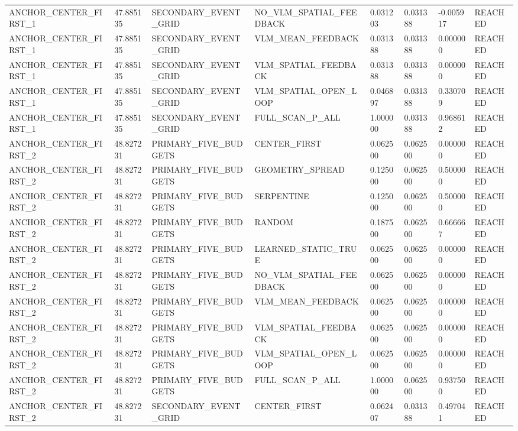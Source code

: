 \begin{tabular}{llllllll}
ANCHOR\_CENTER\_FIRST\_1 & 47.885135 & SECONDARY\_EVENT\_GRID & NO\_VLM\_SPATIAL\_FEEDBACK & 0.031203 & 0.031388 & -0.005917 & REACHED \\
ANCHOR\_CENTER\_FIRST\_1 & 47.885135 & SECONDARY\_EVENT\_GRID & VLM\_MEAN\_FEEDBACK & 0.031388 & 0.031388 & 0.000000 & REACHED \\
ANCHOR\_CENTER\_FIRST\_1 & 47.885135 & SECONDARY\_EVENT\_GRID & VLM\_SPATIAL\_FEEDBACK & 0.031388 & 0.031388 & 0.000000 & REACHED \\
ANCHOR\_CENTER\_FIRST\_1 & 47.885135 & SECONDARY\_EVENT\_GRID & VLM\_SPATIAL\_OPEN\_LOOP & 0.046897 & 0.031388 & 0.330709 & REACHED \\
ANCHOR\_CENTER\_FIRST\_1 & 47.885135 & SECONDARY\_EVENT\_GRID & FULL\_SCAN\_P\_ALL & 1.000000 & 0.031388 & 0.968612 & REACHED \\
ANCHOR\_CENTER\_FIRST\_2 & 48.827231 & PRIMARY\_FIVE\_BUDGETS & CENTER\_FIRST & 0.062500 & 0.062500 & 0.000000 & REACHED \\
ANCHOR\_CENTER\_FIRST\_2 & 48.827231 & PRIMARY\_FIVE\_BUDGETS & GEOMETRY\_SPREAD & 0.125000 & 0.062500 & 0.500000 & REACHED \\
ANCHOR\_CENTER\_FIRST\_2 & 48.827231 & PRIMARY\_FIVE\_BUDGETS & SERPENTINE & 0.125000 & 0.062500 & 0.500000 & REACHED \\
ANCHOR\_CENTER\_FIRST\_2 & 48.827231 & PRIMARY\_FIVE\_BUDGETS & RANDOM & 0.187500 & 0.062500 & 0.666667 & REACHED \\
ANCHOR\_CENTER\_FIRST\_2 & 48.827231 & PRIMARY\_FIVE\_BUDGETS & LEARNED\_STATIC\_TRUE & 0.062500 & 0.062500 & 0.000000 & REACHED \\
ANCHOR\_CENTER\_FIRST\_2 & 48.827231 & PRIMARY\_FIVE\_BUDGETS & NO\_VLM\_SPATIAL\_FEEDBACK & 0.062500 & 0.062500 & 0.000000 & REACHED \\
ANCHOR\_CENTER\_FIRST\_2 & 48.827231 & PRIMARY\_FIVE\_BUDGETS & VLM\_MEAN\_FEEDBACK & 0.062500 & 0.062500 & 0.000000 & REACHED \\
ANCHOR\_CENTER\_FIRST\_2 & 48.827231 & PRIMARY\_FIVE\_BUDGETS & VLM\_SPATIAL\_FEEDBACK & 0.062500 & 0.062500 & 0.000000 & REACHED \\
ANCHOR\_CENTER\_FIRST\_2 & 48.827231 & PRIMARY\_FIVE\_BUDGETS & VLM\_SPATIAL\_OPEN\_LOOP & 0.062500 & 0.062500 & 0.000000 & REACHED \\
ANCHOR\_CENTER\_FIRST\_2 & 48.827231 & PRIMARY\_FIVE\_BUDGETS & FULL\_SCAN\_P\_ALL & 1.000000 & 0.062500 & 0.937500 & REACHED \\
ANCHOR\_CENTER\_FIRST\_2 & 48.827231 & SECONDARY\_EVENT\_GRID & CENTER\_FIRST & 0.062407 & 0.031388 & 0.497041 & REACHED \\

\end{tabular}
